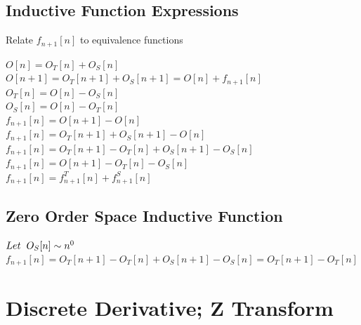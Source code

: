 \documentclass[11pt]{article}
\begin{document}
\subsection{Inductive Function Expressions}
Relate $f_{n+1}[n]$ to equivalence functions
\begin{center}
\vspace{2mm}
$
O[n] = O_T[n] + O_S[n]
$
\\ \vspace{2mm}
$
O[n+1] = O_T[n+1] + O_S[n+1] = O[n] + f_{n+1}[n]
$
\\ \vspace{2mm}
$
O_T[n] = O[n] - O_S[n]
$
\\ \vspace{2mm}
$
O_S[n] = O[n] - O_T[n]
$
\\ \vspace{8mm}
$
f_{n+1}[n] = O[n+1] - O[n]
$
\\ \vspace{2mm}
$
f_{n+1}[n] = O_T[n+1] + O_S[n+1] - O[n]
$
\\ \vspace{2mm}
$
f_{n+1}[n] = O_T[n+1] - O_T[n] + O_S[n+1] - O_S[n]
$
\\ \vspace{2mm}
$
f_{n+1}[n] = O[n+1] - O_T[n] - O_S[n]
$
\\ \vspace{2mm}
$
f_{n+1}[n] =  f^T_{n+1}[n] +  f^S_{n+1}[n]
$
\end{center}






\subsection{Zero Order Space Inductive Function}
\begin{center}
$
Let \hspace{2mm} O_S[n] \sim n^0
$
\\ \vspace{2mm}
$
f_{n+1}[n] = O_T[n+1] - O_T[n] + O_S[n+1] - O_S[n] = O_T[n+1] - O_T[n]
$
\end{center}





\newpage

\section{Discrete Derivative; Z Transform}
\end{document}
